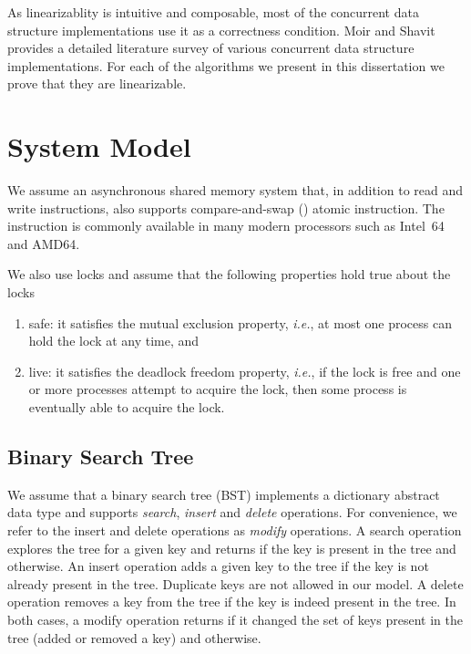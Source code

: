 As linearizablity is intuitive and composable, most of the concurrent data structure implementations use it as a correctness condition. Moir and Shavit~\cite{moirSha:2007} provides a detailed literature survey of various concurrent data structure implementations. For each of the algorithms we present in this dissertation we prove that they are linearizable.


\section{System Model}
We assume an asynchronous shared memory system that, in addition to read and write instructions, also supports compare-and-swap (\CAS{}) atomic instruction. The \CAS{} instruction is commonly available in many modern processors such as Intel~64 and AMD64. 

We also use locks and assume that the following properties hold true about the locks
\begin{enumerate}[label=(\alph*)]
\item safe: it satisfies the mutual exclusion property, \emph{i.e.}, at most one process can hold the lock at any time, and 
\item live: it satisfies the deadlock freedom property, \emph{i.e.}, if the lock is free and one or more processes attempt to acquire the lock, then some process is eventually able to acquire the lock.
\end{enumerate}

\subsection{Binary Search Tree}
We assume that a binary search tree (BST) implements a dictionary abstract data type and supports \emph{search}, \emph{insert} and \emph{delete} operations. For convenience, we refer to the insert and delete operations as \emph{modify} operations. A search operation explores the tree for a given key and returns \true{} if the key is present in the tree and \false{} otherwise. An insert operation adds a given key to the tree if the key is not already present in the tree. Duplicate keys are not allowed in our model. A delete operation removes a key from the tree if the key is indeed present in the tree. In both cases, a modify operation returns \true{} if it changed the set of keys present in the tree (added or removed a key) and \false{} otherwise.

